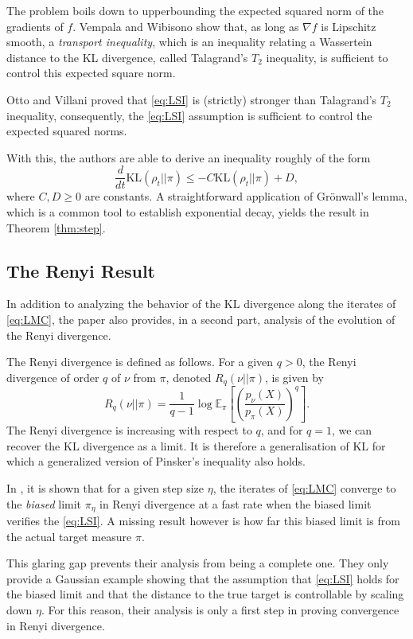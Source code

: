 \documentclass[10pt,journal,a4paper]{IEEEtran}
\theoremstyle{definition}
\newcommand{\E}{\mathbb{E}}
\newcommand{\KL}{\text{KL}}
\begin{document}
The problem boils down to upperbounding the expected squared norm of the gradients of $f$. Vempala and Wibisono show that, as long as $\nabla f$ is Lipschitz smooth, a \textit{transport inequality}, which is an inequality relating a Wassertein distance to the KL divergence, called Talagrand's $T_2$ inequality, is sufficient to control this expected square norm. 

Otto and Villani \cite{otto_generalization_2000} proved that \eqref{eq:LSI} is (strictly) stronger than Talagrand's $T_2$ inequality, consequently, the \eqref{eq:LSI} assumption is sufficient to control the expected squared norms.

With this, the authors are able to derive an inequality roughly of the form
\[
\frac{d}{dt}\KL(\rho_t || \pi) \leq -C\KL(\rho_t || \pi) + D,
\]
where $C, D \geq 0$ are constants. A straightforward application of Gr\"onwall's lemma, which is a common tool to establish exponential decay, yields the result in Theorem \ref{thm:step}.

\subsection{The Renyi Result}

In addition to analyzing the behavior of the $\KL$ divergence along the iterates of \eqref{eq:LMC}, the paper also provides, in a second part, analysis of the evolution of the Renyi divergence.

The Renyi divergence is defined as follows. For a given $q > 0$, the Renyi divergence of order $q$ of $\nu$ from $\pi$, denoted $R_q(\nu || \pi)$, is given by
\[
R_q(\nu || \pi) = \frac{1}{q-1}\log\E_\pi\left[\left( \frac{p_{\nu}(X)}{p_\pi(X)}\right)^q\right].
\]
The Renyi divergence is increasing with respect to $q$, and for $q=1$, we can recover the $\KL$ divergence as a limit. It is therefore a generalisation of $\KL$ for which a generalized version of Pinsker's inequality also holds.

In \cite{vempala_rapid_2019}, it is shown that for a given step size $\eta$, the iterates of \eqref{eq:LMC} converge to the \textit{biased} limit $\pi_\eta$ in Renyi divergence at a fast rate when the biased limit verifies the \eqref{eq:LSI}. A missing result however is how far this biased limit is from the actual target measure $\pi$.

This glaring gap prevents their analysis from being a complete one. They only provide a Gaussian example showing that the assumption that \eqref{eq:LSI} holds for the biased limit and that the distance to the true target is controllable by scaling down $\eta$. For this reason, their analysis is only a first step in proving convergence in Renyi divergence.
\end{document}
